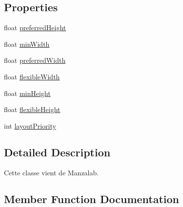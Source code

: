 \subsection*{Properties}
\begin{DoxyCompactItemize}
\item 
float \hyperlink{class_horizontal_resize_as_a968a6eac85a710489cacddad8fc9ffd1}{preferred\+Height}
\item 
float \hyperlink{class_horizontal_resize_as_ad7bf56440f7dc3326620b356b5789f2e}{min\+Width}
\item 
float \hyperlink{class_horizontal_resize_as_aadc4d17f4c258ca1b16de61bd27b33c4}{preferred\+Width}
\item 
float \hyperlink{class_horizontal_resize_as_a8262586692bf0e3023eb556141fe1b1e}{flexible\+Width}
\item 
float \hyperlink{class_horizontal_resize_as_a77132745a286eb96e4d4428f5c28e49e}{min\+Height}
\item 
float \hyperlink{class_horizontal_resize_as_aced70b10fce1296895c75dba386cf361}{flexible\+Height}
\item 
int \hyperlink{class_horizontal_resize_as_a4a0a623c774646bd98f4b7ea8e533a09}{layout\+Priority}
\end{DoxyCompactItemize}


\subsection{Detailed Description}
Cette classe vient de Manzalab. 



\subsection{Member Function Documentation}
\mbox{\label{class_horizontal_resize_as_aad66debc7373d6813f95448b92acbc80}} 

